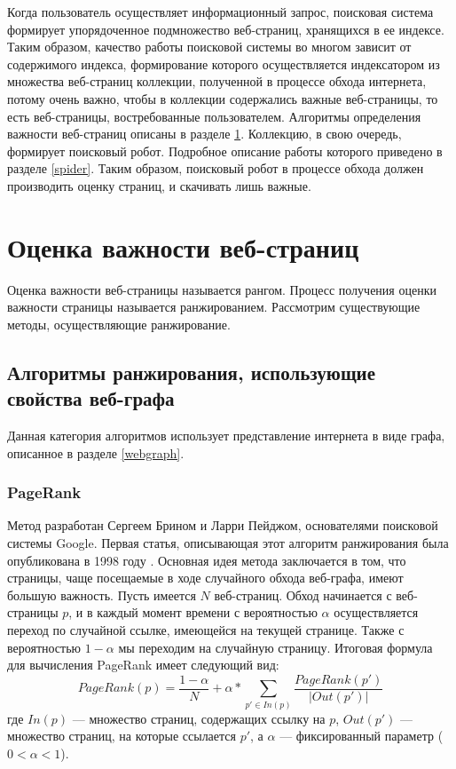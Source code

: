 Когда пользователь осуществляет информационный запрос, поисковая система формирует упорядоченное подмножество веб-страниц, хранящихся в ее индексе. Таким образом, качество работы поисковой системы во многом зависит от содержимого индекса, формирование которого осуществляется индексатором из множества веб-страниц коллекции, полученной в процессе обхода интернета, потому очень важно, чтобы в коллекции содержались важные веб-страницы, то есть веб-страницы, востребованные пользователем. Алгоритмы определения важности веб-страниц описаны в разделе \ref{ranking}. Коллекцию, в свою очередь, формирует поисковый робот. Подробное описание работы которого приведено в разделе \ref{spider}. Таким образом, поисковый робот в процессе обхода должен производить оценку страниц, и скачивать лишь важные. 

\section{Оценка важности веб-страниц}
\label{ranking}

Оценка важности веб-страницы называется рангом. Процесс получения оценки важности страницы называется ранжированием. Рассмотрим существующие методы, осуществляющие ранжирование.

\subsection{Алгоритмы ранжирования, использующие свойства веб-графа}

Данная категория алгоритмов использует представление интернета в виде графа, описанное в разделе \ref{webgraph}.

\subsubsection*{PageRank}

Метод разработан Сергеем Брином и Ларри Пейджом, основателями поисковой системы Google. Первая статья, описывающая этот алгоритм ранжирования была опубликована в 1998 году \cite{Brin}. Основная идея метода заключается в том, что страницы, чаще посещаемые в ходе случайного обхода веб-графа, имеют большую важность. 
Пусть имеется $N$ веб-страниц. Обход начинается с веб-страницы $p$, и в каждый момент времени с вероятностью $\alpha$ осуществляется переход по случайной ссылке, имеющейся на текущей странице. Также с вероятностью $1 - \alpha$ мы переходим на случайную страницу. Итоговая формула для вычисления PageRank имеет следующий вид: 
$$PageRank(p) = \frac{1 - \alpha}{N} + \alpha * \sum_{p' \in In(p)} \frac{PageRank(p')}{|Out(p')|}$$
где $In(p)$ --- множество страниц, содержащих ссылку на $p$, $Out(p')$ --- множество страниц, на которые ссылается $p'$, а $\alpha$ --- фиксированный параметр ($0 < \alpha < 1$). 


